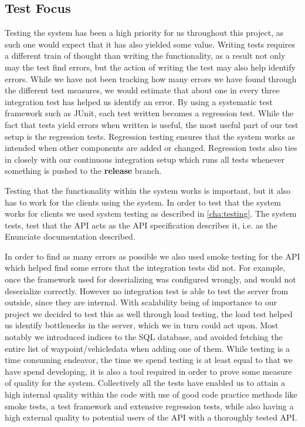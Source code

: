 \subsection{Test Focus}
Testing the system has been a high priority for us throughout this project, as such one would expect that it has also yielded some value.
Writing tests requires a different train of thought than writing the functionality, as a result not only may the test find errors, but the action of writing the test may also help identify errors.
While we have not been tracking how many errors we have found through the different test measures, we would estimate that about one in every three integration test has helped us identify an error.
By using a systematic test framework such as JUnit, each test written becomes a regression test.
While the fact that tests yield errors when written is useful, the most useful part of our test setup is the regression tests.
Regression testing ensures that the system works as intended when other components are added or changed.
Regression tests also ties in closely with our continuous integration setup which runs all tests whenever something is pushed to the \textbf{release} branch.

\bigskip
Testing that the functionality within the system works is important, but it also has to work for the clients using the system.
In order to test that the system works for clients we used system testing as described in \cref{cha:testing}.
The system tests, test that the API acts as the API specification describes it, i.e. as the Enunciate documentation described.%

In order to find as many errors as possible we also used smoke testing for the API which helped find some errors that the integration tests did not.
For example, once the framework used for deserializing was configured wrongly, and would not deserialize correctly. 
However no integration test is able to test the server from outside, since they are internal.  
With scalability being of importance to our project we decided to test this as well through load testing, the load test helped us identify bottlenecks in the server, which we in turn could act upon.
Most notably we introduced indices to the SQL database, and avoided fetching the entire list of waypoint/vehicledata when adding one of them.  
While testing is a time consuming endeavor, the time we spend testing is at least equal to that we have spend developing, it is also a tool required in order to prove some measure of quality for the system.
Collectively all the tests have enabled us to attain a high internal quality within the code with use of good code practice methods like smoke tests, a test framework and extensive regression tests, while also having a high external quality to potential users of the API with a thoroughly tested API.

